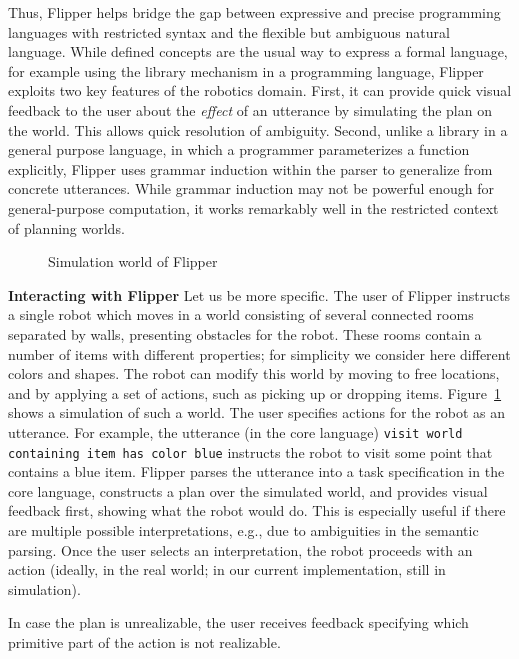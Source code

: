 \documentclass[letterpaper, 10 pt, conference]{ieeeconf}  %
\newcommand{\tool}{Flipper\xspace}
\begin{document}
Thus, \tool helps bridge the gap between expressive and precise programming languages with restricted syntax
and the flexible but ambiguous natural language.
While defined concepts are the usual way to express a formal language, for example using the library mechanism in a programming
language, \tool exploits two key features of the robotics domain.
First, it can provide quick visual feedback to the user about the \emph{effect} of an utterance by simulating
the plan on the world.
This allows quick resolution of ambiguity.
Second, unlike a library in a general purpose language, in which a programmer parameterizes a function explicitly,
\tool uses grammar induction within the parser to generalize from concrete utterances.
While grammar induction may not be powerful enough for general-purpose computation, it works remarkably well
in the restricted context of planning worlds.


\begin{figure}[t]
\caption{Simulation world of \tool}
\label{fig:simulationWorld}
\end{figure}


\smallskip
\noindent
\textbf{Interacting with \tool}
Let us be more specific.
The user of \tool instructs a single robot which moves in a world
consisting of several connected rooms separated by walls, presenting obstacles for the robot.
These rooms contain a number of items with different properties; for simplicity we consider here different
colors and shapes.
The robot can modify this world by moving to free locations,
and by applying a set of actions, such as picking up or dropping items.
Figure~\ref{fig:simulationWorld} shows a simulation of such a world.
The user specifies actions for the robot as an utterance.
For example, the utterance (in the core language) \lstinline{visit world containing item has color blue}
instructs the robot to visit some point that contains a blue item.
\tool parses the utterance into a task specification in the core language, constructs a plan over the simulated
world, and provides visual feedback first, showing what the robot would do.
This is especially useful if there are multiple possible interpretations, e.g., due to ambiguities
in the semantic parsing.
Once the user selects an interpretation, the robot proceeds with an action (ideally,
in the real world; in our current implementation, still in simulation). 

In case the plan is unrealizable, the user receives feedback specifying which primitive part of the
action is not realizable.
\end{document}
